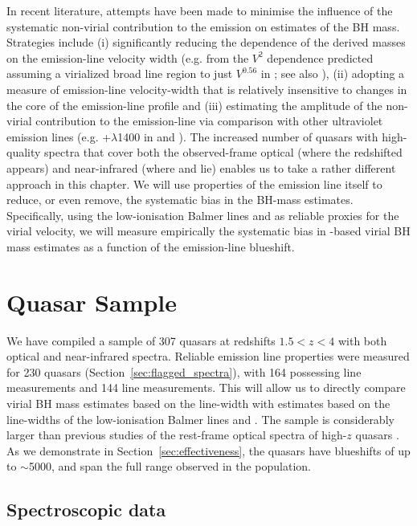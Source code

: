 In recent literature, attempts have been made to minimise the influence of the systematic non-virial contribution to the  emission on estimates of the BH mass. 
Strategies include (i) significantly reducing the dependence of the derived masses on the emission-line velocity width (e.g. from the $V^2$ dependence predicted assuming a virialized broad line region to just $V^{0.56}$ in \citealt{park13}; see also \citealt{shen12}), (ii) adopting a measure of emission-line velocity-width that is relatively insensitive to changes in the core of the emission-line profile \citep[e.g.][]{denney13} and (iii) estimating the amplitude of the non-virial contribution to the  emission-line via comparison with other ultraviolet emission lines (e.g. +$\lambda$1400 in \citealt{runnoe13} and \citealt{brotherton15}).
The increased number of quasars with high-quality spectra that cover both the observed-frame optical (where the redshifted  appears) and near-infrared (where \hb and \ha lie) enables us to take a rather different approach in this chapter.
We will use properties of the  emission line itself to reduce, or even remove, the systematic bias in the BH-mass estimates. 
Specifically, using the low-ionisation Balmer lines \ha and \hb as reliable proxies for the virial velocity, we will measure empirically the systematic bias in -based virial BH mass estimates as a function of the  emission-line blueshift.

\section{Quasar Sample}

We have compiled a sample of 307 quasars at redshifts $1.5 < z < 4$ with both optical and near-infrared spectra.  
Reliable emission line properties were measured for 230 quasars (Section~\ref{sec:flagged_spectra}), with 164 possessing \ha line measurements and 144 \hb line measurements.  
This will allow us to directly compare virial BH mass estimates based on the  line-width with estimates based on the line-widths of the low-ionisation Balmer lines \ha and \hbns.  
The sample is considerably larger than previous studies of the rest-frame optical spectra of high-$z$ quasars \citep[e.g.][]{shen12}. 
As we demonstrate in Section~\ref{sec:effectiveness}, the quasars have  blueshifts of up to $\sim$5000\kms, and span the full range observed in the population. 

\subsection{Spectroscopic data}


